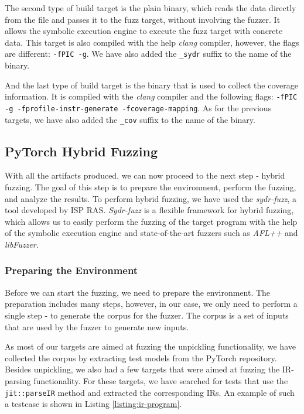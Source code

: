 The second type of build target is the plain binary, which reads the data directly from the file and passes it to the fuzz target, without involving the fuzzer. It allows the symbolic execution engine to execute the fuzz target with concrete data. This target is also compiled with the help \textit{clang} compiler, however, the flags are different: \texttt{-fPIC -g}. We have also added the \texttt{\_sydr} suffix to the name of the binary.

And the last type of build target is the binary that is used to collect the coverage information. It is compiled with the \textit{clang} compiler and the following flags: \texttt{-fPIC -g -fprofile-instr-generate -fcoverage-mapping}. As for the previous targets, we have also added the \texttt{\_cov} suffix to the name of the binary.

\subsection{PyTorch Hybrid Fuzzing}

With all the artifacts produced, we can now proceed to the next step - hybrid fuzzing. The goal of this step is to prepare the environment, perform the fuzzing, and analyze the results. To perform hybrid fuzzing, we have used the \textit{sydr-fuzz}, a tool developed by ISP RAS. \textit{Sydr-fuzz} is a flexible framework for hybrid fuzzing, which allows us to easily perform the fuzzing of the target program with the help of the symbolic execution engine and state-of-the-art fuzzers such as \textit{AFL++} and \textit{libFuzzer}.

\subsubsection{Preparing the Environment}

Before we can start the fuzzing, we need to prepare the environment. The preparation includes many steps, however, in our case, we only need to perform a single step - to generate the corpus for the fuzzer. The corpus is a set of inputs that are used by the fuzzer to generate new inputs.

As most of our targets are aimed at fuzzing the unpickling functionality, we have collected the corpus by extracting test models from the PyTorch repository. Besides unpickling, we also had a few targets that were aimed at fuzzing the IR-parsing functionality. For these targets, we have searched for tests that use the \texttt{jit::parseIR} method and extracted the corresponding IRs. An example of such a testcase is shown in Listing \ref{listing:ir-program}.

